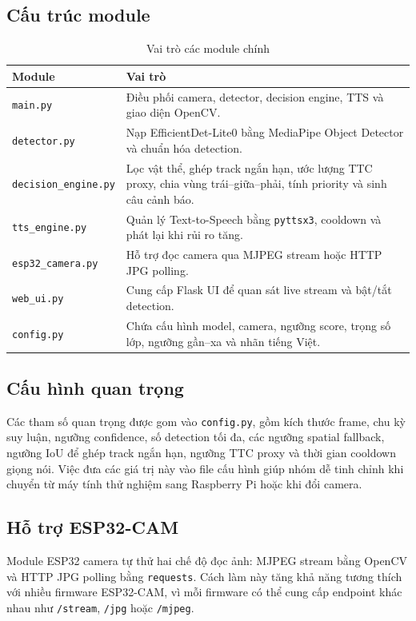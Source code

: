 \documentclass[twoside,final]{hcmut-report}
\begin{document}
\subsection{Cấu trúc module}
\begin{table}[H]
  \centering
  \caption{Vai trò các module chính}
  \label{tab:module-role}
  \begin{tabularx}{\textwidth}{L{4.2cm}Y}
    \toprule
    \textbf{Module} & \textbf{Vai trò} \\
    \midrule
    \texttt{main.py} & Điều phối camera, detector, decision engine, TTS và giao diện OpenCV. \\
    \texttt{detector.py} & Nạp EfficientDet-Lite0 bằng MediaPipe Object Detector và chuẩn hóa detection. \\
    \texttt{decision\_engine.py} & Lọc vật thể, ghép track ngắn hạn, ước lượng TTC proxy, chia vùng trái--giữa--phải, tính priority và sinh câu cảnh báo. \\
    \texttt{tts\_engine.py} & Quản lý Text-to-Speech bằng \texttt{pyttsx3}, cooldown và phát lại khi rủi ro tăng. \\
    \texttt{esp32\_camera.py} & Hỗ trợ đọc camera qua MJPEG stream hoặc HTTP JPG polling. \\
    \texttt{web\_ui.py} & Cung cấp Flask UI để quan sát live stream và bật/tắt detection. \\
    \texttt{config.py} & Chứa cấu hình model, camera, ngưỡng score, trọng số lớp, ngưỡng gần--xa và nhãn tiếng Việt. \\
    \bottomrule
  \end{tabularx}
\end{table}

\subsection{Cấu hình quan trọng}
Các tham số quan trọng được gom vào \texttt{config.py}, gồm kích thước frame, chu kỳ suy luận, ngưỡng confidence, số detection tối đa, các ngưỡng spatial fallback, ngưỡng IoU để ghép track ngắn hạn, ngưỡng TTC proxy và thời gian cooldown giọng nói. Việc đưa các giá trị này vào file cấu hình giúp nhóm dễ tinh chỉnh khi chuyển từ máy tính thử nghiệm sang Raspberry Pi hoặc khi đổi camera.

\subsection{Hỗ trợ ESP32-CAM}
Module ESP32 camera tự thử hai chế độ đọc ảnh: MJPEG stream bằng OpenCV và HTTP JPG polling bằng \texttt{requests}. Cách làm này tăng khả năng tương thích với nhiều firmware ESP32-CAM, vì mỗi firmware có thể cung cấp endpoint khác nhau như \texttt{/stream}, \texttt{/jpg} hoặc \texttt{/mjpeg}.
\end{document}
